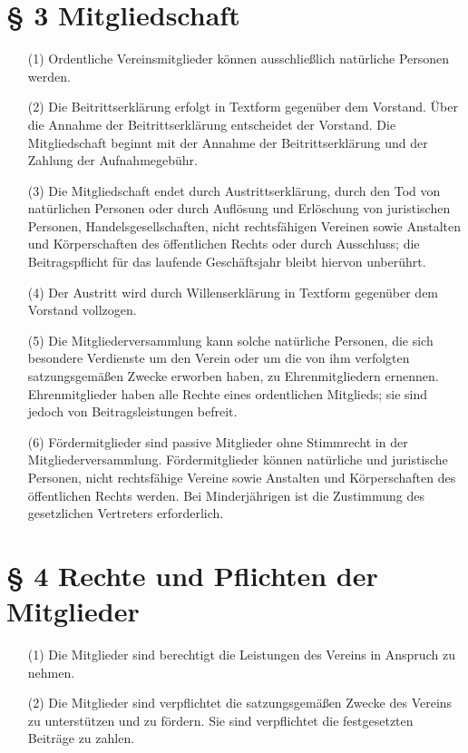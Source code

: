 \documentclass[12pt,paper=a4,ngerman]{scrreprt}
\begin{document}
\section{\S{} 3 Mitgliedschaft}

\begin{itemize}
\item[(1)]
Ordentliche Vereinsmitglieder können ausschließlich natürliche
Personen werden.
\item[(2)]
Die Beitrittserklärung erfolgt in Textform gegenüber dem Vorstand.
Über die Annahme der Beitrittserklärung entscheidet der Vorstand. Die
Mitgliedschaft beginnt mit der Annahme der Beitrittserklärung und der
Zahlung der Aufnahmegebühr.
\item[(3)]
Die Mitgliedschaft endet durch Austrittserklärung, durch den Tod von
natürlichen Personen oder durch Auflösung und Erlöschung von
juristischen Personen, Handelsgesellschaften, nicht rechtsfähigen
Vereinen sowie Anstalten und Körperschaften des öffentlichen Rechts
oder durch Ausschluss; die Beitragspflicht für das laufende
Geschäftsjahr bleibt hiervon unberührt.
\item[(4)]
Der Austritt wird durch Willenserklärung in Textform gegenüber dem
Vorstand vollzogen.
\item[(5)]
Die Mitgliederversammlung kann solche natürliche Personen, die sich
besondere Verdienste um den Verein oder um die von ihm verfolgten
satzungsgemäßen Zwecke erworben haben, zu Ehrenmitgliedern ernennen.
Ehrenmitglieder haben alle Rechte eines ordentlichen Mitglieds; sie
sind jedoch von Beitragsleistungen befreit.
\item[(6)]
Fördermitglieder sind passive Mitglieder ohne Stimmrecht in der
Mitgliederversammlung. Fördermitglieder können natürliche und
juristische Personen, nicht rechtsfähige Vereine sowie Anstalten und
Körperschaften des öffentlichen Rechts werden. Bei Minderjährigen ist
die Zustimmung des gesetzlichen Vertreters erforderlich.
\end{itemize}

\section{\S{} 4 Rechte und Pflichten der Mitglieder}

\begin{itemize}
\item[(1)]
Die Mitglieder sind berechtigt die Leistungen des Vereins in Anspruch
zu nehmen.
\item[(2)]
Die Mitglieder sind verpflichtet die satzungsgemäßen Zwecke des
Vereins zu unterstützen und zu fördern. Sie sind verpflichtet die
festgesetzten Beiträge zu zahlen.
\end{itemize}
\end{document}
